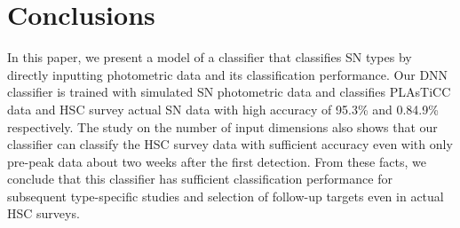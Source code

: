 \documentclass[useamsfonts]{pasj01}
\begin{document}
\section{Conclusions}
%
In this paper, we present a model of a classifier that classifies SN types by directly inputting photometric data and its classification performance.
Our DNN classifier is trained with simulated SN photometric data and classifies PLAsTiCC data and HSC survey actual SN data with high accuracy of 95.3\% and 0.84.9\% respectively.
The study on the number of input dimensions also shows that our classifier can classify the HSC survey data with sufficient accuracy even with only pre-peak data about two weeks after the first detection.
From these facts, we conclude that this classifier has sufficient classification performance for subsequent type-specific studies and selection of follow-up targets even in actual HSC surveys.
%
\end{document}
